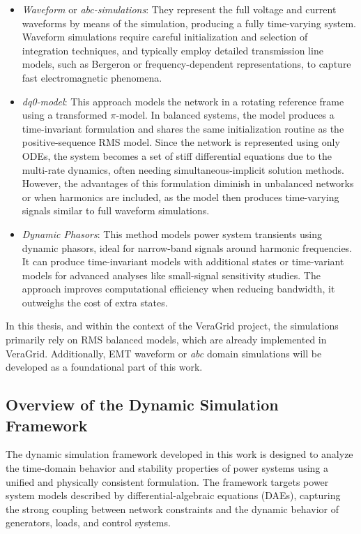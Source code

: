 \begin{itemize}
    \item \textit{Waveform} or \textit{abc-simulations}: They represent the full voltage and current waveforms by means of the simulation, producing a fully time-varying system. 
Waveform simulations require careful initialization and selection of integration techniques, and typically employ detailed transmission line models, such as Bergeron or frequency-dependent
representations, to capture fast electromagnetic phenomena.
    \item \textit{dq0-model}: This approach models the network in a rotating reference frame using a transformed $\pi$-model. In balanced systems, the model produces a time-invariant 
    formulation and shares the same initialization routine as the positive-sequence RMS model. Since the network is represented using only ODEs, the system becomes a set of 
    stiff differential equations due to the multi-rate dynamics, often needing simultaneous-implicit solution methods. However, the advantages of this 
    formulation diminish in unbalanced networks or when harmonics are included, as the model then produces time-varying signals similar to full waveform simulations.
    \item \textit{Dynamic Phasors}: This method models power system transients using dynamic phasors, ideal for narrow-band signals around harmonic frequencies. 
    It can produce time-invariant models with additional states or time-variant models for advanced analyses like small-signal sensitivity studies. 
    The approach improves computational efficiency when reducing bandwidth, it outweighs the cost of extra states.
\end{itemize}

In this thesis, and within the context of the VeraGrid project, the simulations primarily rely on RMS balanced models, which are already implemented in VeraGrid. 
Additionally, EMT waveform  or \textit{abc} domain simulations will be developed as a foundational part of this work.

\subsection{Overview of the Dynamic Simulation Framework}

The dynamic simulation framework developed in this work is designed to analyze the
time-domain behavior and stability properties of power systems using a unified and
physically consistent formulation. The framework targets power system models described
by differential-algebraic equations (DAEs), capturing the strong coupling between network
constraints and the dynamic behavior of generators, loads, and control systems.

